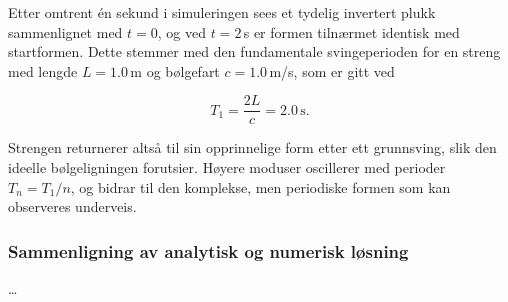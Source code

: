 Etter omtrent én sekund i simuleringen sees et tydelig invertert plukk sammenlignet med $t=0$, og ved $t=2$\,s er formen tilnærmet identisk med startformen. 
Dette stemmer med den fundamentale svingeperioden for en streng med lengde $L=1.0$\,m og bølgefart $c=1.0$\,m/s, som er gitt ved

\begin{equation*}
T_1 = \frac{2L}{c} = 2.0\,\text{s}.
\end{equation*}

Strengen returnerer altså til sin opprinnelige form etter ett grunnsving, slik den ideelle bølgeligningen forutsier. 
Høyere moduser oscillerer med perioder $T_n = T_1/n$, og bidrar til den komplekse, men periodiske formen som kan observeres underveis.


\subsubsection{Sammenligning av analytisk og numerisk løsning}
\dots


